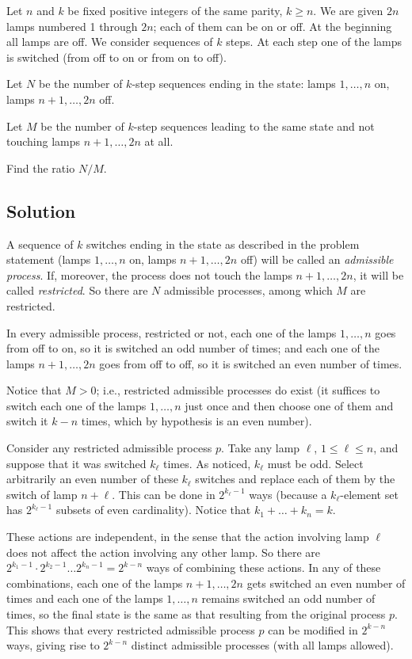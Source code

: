 \documentclass[11pt]{article}
\begin{document}
\noindent Let $n$ and $k$ be fixed positive integers of the same parity, $k \ge n$. We are given $2n$ lamps numbered 1 through $2n$; each of them can be on or off. At the beginning all lamps are off. We consider sequences of $k$ steps. At each step one of the lamps is switched (from off to on or from on to off).

\medskip
\noindent Let $N$ be the number of $k$-step sequences ending in the state: lamps $1, \dots, n$ on, lamps $n+1, \dots, 2n$ off.

\medskip
\noindent Let $M$ be the number of $k$-step sequences leading to the same state and not touching lamps $n+1, \dots, 2n$ at all.

\medskip
\noindent Find the ratio $N/M$.

\subsection*{Solution}
A sequence of $k$ switches ending in the state as described in the problem statement (lamps $1, \dots, n$ on, lamps $n+1, \dots, 2n$ off) will be called an \emph{admissible process}. If, moreover, the process does not touch the lamps $n+1, \dots, 2n$, it will be called \emph{restricted}. So there are $N$ admissible processes, among which $M$ are restricted.

In every admissible process, restricted or not, each one of the lamps $1, \dots, n$ goes from off to on, so it is switched an odd number of times; and each one of the lamps $n+1, \dots, 2n$ goes from off to off, so it is switched an even number of times.

Notice that $M > 0$; i.e., restricted admissible processes do exist (it suffices to switch each one of the lamps $1, \dots, n$ just once and then choose one of them and switch it $k - n$ times, which by hypothesis is an even number).

Consider any restricted admissible process $p$. Take any lamp $\ell$, $1 \le \ell \le n$, and suppose that it was switched $k_\ell$ times. As noticed, $k_\ell$ must be odd. Select arbitrarily an even number of these $k_\ell$ switches and replace each of them by the switch of lamp $n+\ell$. This can be done in $2^{k_\ell-1}$ ways (because a $k_\ell$-element set has $2^{k_\ell-1}$ subsets of even cardinality). Notice that $k_1 + \dots + k_n = k$.

These actions are independent, in the sense that the action involving lamp $\ell$ does not affect the action involving any other lamp. So there are $2^{k_1-1} \cdot 2^{k_2-1} \dots 2^{k_n-1} = 2^{k-n}$ ways of combining these actions. In any of these combinations, each one of the lamps $n+1, \dots, 2n$ gets switched an even number of times and each one of the lamps $1, \dots, n$ remains switched an odd number of times, so the final state is the same as that resulting from the original process $p$. This shows that every restricted admissible process $p$ can be modified in $2^{k-n}$ ways, giving rise to $2^{k-n}$ distinct admissible processes (with all lamps allowed).
\end{document}
